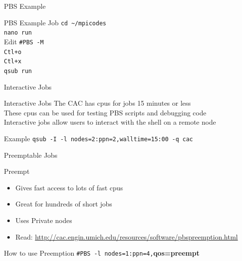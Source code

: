 \documentclass{beamer}
\begin{document}
\begin{frame}{PBS Example}
 \begin{block}{PBS Example Job}
  \texttt{cd \~{}/mpicodes}
  \\ \texttt{nano run}
  \\ Edit \texttt{\#PBS -M}
  \\ \texttt{Ctl+o}
  \\ \texttt{Ctl+x}
  \\ \texttt{qsub run}
 \end{block}
\end{frame}
\begin{frame}{Interactive Jobs}
 \begin{block}{Interactive Jobs}
   {The CAC has cpus for jobs 15 minutes or less \\}
   {These cpus can be used for testing PBS scripts and debugging code \\}
   {Interactive jobs allow users to interact with the shell on a remote node \\}
 \end{block}
 \begin{block}{Example}
   {\texttt{qsub -I -l nodes=2:ppn=2,walltime=15:00 -q cac}}
 \end{block}
\end{frame}
\begin{frame}{Preemptable Jobs}
 \begin{block}{Preempt}
  \begin{itemize}
   \item{Gives fast access to lots of fast cpus}
   \item{Great for hundreds of short jobs}
   \item{Uses Private nodes}
   \item{Read: \url{http://cac.engin.umich.edu/resources/software/pbspreemption.html}}
  \end{itemize}
 \end{block}
 \begin{block}{How to use Preemption}
  \texttt{\#PBS -l nodes=1:ppn=4,}\textbf{qos=preempt}
 \end{block}
\end{frame}
\end{document}
